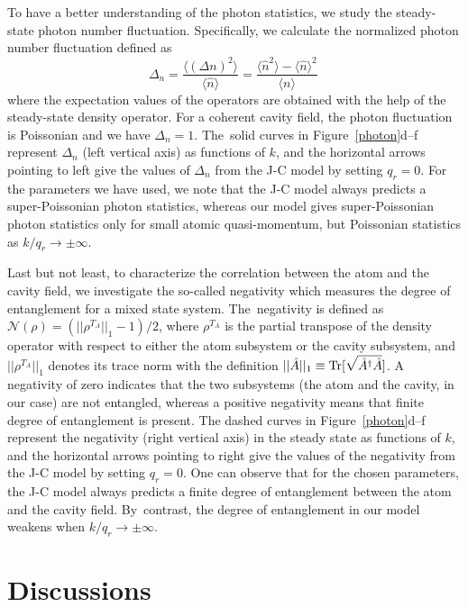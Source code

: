 \documentclass[atoms,article,accept,moreauthors,pdftex,12pt,a4paper]{mdpi}
\begin{document}
To have a better understanding of the photon statistics, we study the steady-state photon number fluctuation. Specifically, we calculate the normalized photon number fluctuation defined as
\[\Delta_n = \frac{\langle(\Delta n)^{2}\rangle}{\langle \hat{n}\rangle}=\frac{\langle \hat{n}^{2}\rangle-\langle \hat{n}\rangle^{2}}{\langle n\rangle} \,\]
where the expectation values of the operators are obtained with the help of the steady-state density operator. For a coherent cavity field, the photon fluctuation is Poissonian and we have $\Delta_n=1$.
The~solid curves in Figure~\ref{photon}d--f represent $\Delta_n$ (left vertical axis) as functions of $k$, and the horizontal arrows pointing to left give the values of $\Delta_n$ from the J-C model by setting $q_r=0$. For the parameters we have used, we note that the J-C model always predicts a super-Poissonian photon statistics, whereas our model gives super-Poissonian photon statistics only for small atomic quasi-momentum, but Poissonian statistics as $k/q_r \rightarrow \pm \infty$.

Last but not least, to characterize the correlation between the atom and the cavity field, we investigate the so-called negativity \cite{negativity} which measures the degree of entanglement for a mixed state system.
The~negativity is defined as $\mathcal{N}(\rho)=(||\rho^{T_A}||_1-1)/2$, where $\rho^{T_A}$ is the partial transpose of the density operator with respect to either the atom subsystem or the cavity subsystem, and $||\rho^{T_A}||_1$ denotes its trace norm with the definition $||\hat{A}||_1 \equiv {\rm Tr}[\sqrt{\hat{A}^\dag \hat{A}} ]$. A negativity of zero indicates that the two subsystems (the atom and the cavity, in our case) are not entangled, whereas a positive negativity means that finite degree of entanglement is present. The dashed curves in Figure~\ref{photon}d--f represent the negativity (right vertical axis) in the steady state as functions of $k$, and the horizontal arrows pointing to right give the values of the negativity from the J-C model by setting $q_r=0$. One can observe that for the chosen parameters, the J-C model always predicts a finite degree of entanglement between the atom and the cavity field. By~contrast, the degree of entanglement in our model weakens when $k/q_r \rightarrow \pm \infty$.



\section{Discussions} \label{relation}
\end{document}
